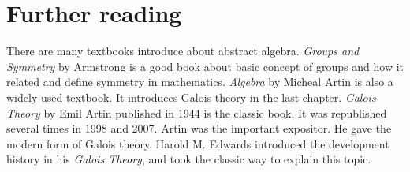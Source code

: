 \documentclass{article}
\begin{document}
\begin{Exercise}
\end{Exercise}

\section{Further reading}

There are many textbooks introduce about abstract algebra. {\em Groups and Symmetry} by Armstrong is a good book about basic concept of groups and how it related and define symmetry in mathematics. {\em Algebra} by Micheal Artin is also a widely used textbook. It introduces Galois theory in the last chapter. {\em Galois Theory} by Emil Artin published in 1944 is the classic book. It was republished several times in 1998 and 2007. Artin was the important expositor. He gave the modern form of Galois theory. Harold M. Edwards introduced the development history in his {\em Galois Theory}, and took the classic way to explain this topic.
\end{document}
